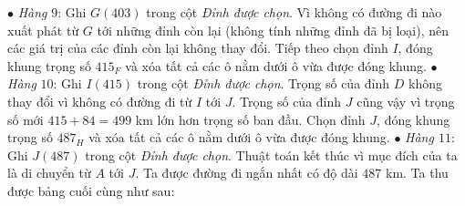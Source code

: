 \begin{multicols}{2}
	\vskip 0.05cm
	$\bullet$ \textit{Hàng} $9$: Ghi $G(403)$ trong cột \textit{Đỉnh được chọn}. Vì không có đường đi nào xuất phát từ $G$ tới những đỉnh còn lại (không tính những đỉnh đã bị loại), nên các giá trị của các đỉnh còn lại không thay đổi. Tiếp theo chọn đỉnh $I$, đóng khung trọng số $415_F$ và xóa tất cả các ô nằm dưới ô vừa được đóng khung. 
	\vskip 0.1cm
	$\bullet$ \textit{Hàng} $10$: Ghi $I(415)$ trong cột \textit{Đỉnh được chọn}. Trọng số của đỉnh $D$ không thay đổi vì không có đường đi từ $I$ tới $J$. Trọng số của đỉnh $J$ cũng vậy vì trọng số mới $415+84=499$ km lớn hơn trọng số ban đầu.  Chọn đỉnh $J$, đóng khung trọng số $487_H$ và xóa tất cả các ô nằm dưới ô vừa được đóng khung.
	\vskip 0.1cm 
	$\bullet$ \textit{Hàng $11$}: Ghi $J(487)$ trong cột \textit{Đỉnh được chọn}. Thuật toán kết thúc vì mục đích của ta là di chuyển từ $A$ tới $J$.  Ta được đường đi ngắn nhất có độ dài $487$ km. 
	\vskip 0.1cm
	Ta thu được bảng cuối cùng như sau:
	\begin{table}[H]
		\vspace*{-5pt}
		\centering
		\captionsetup{labelformat= empty, justification=centering}
\end{table}
\end{multicols}
